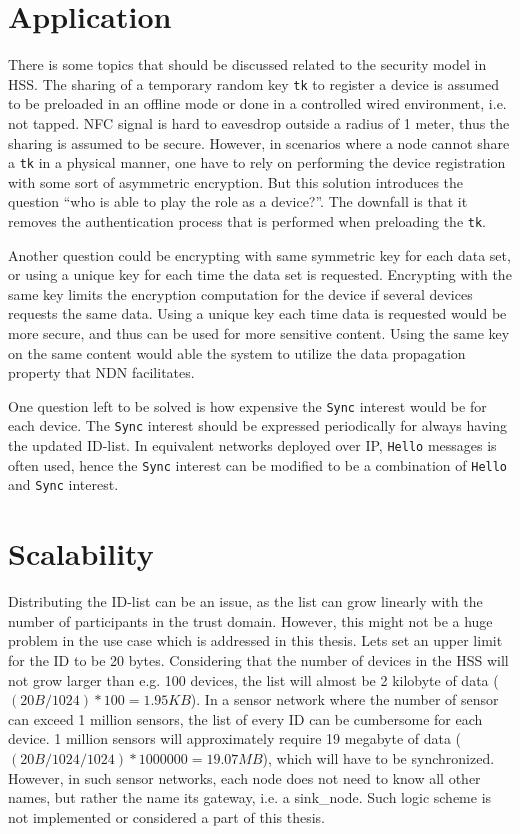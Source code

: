 \section{Application}
There is some topics that should be discussed related to the security model in \gls{HSS}.
The sharing of a temporary random key \texttt{tk} to register a device is assumed to be preloaded in an offline mode or done in a controlled wired environment, i.e. not tapped. 
\gls{NFC} signal is hard to eavesdrop outside a radius of 1 meter, thus the sharing is assumed to be secure.
However, in scenarios where a node cannot share a \texttt{tk} in a physical manner, one have to rely on performing the device registration with some sort of asymmetric encryption. 
But this solution introduces the question ``who is able to play the role as a device?''.
The downfall is that it removes the authentication process that is performed when preloading the \texttt{tk}.

Another question could be encrypting with same symmetric key for each data set, or using a unique key for each time the data set is requested.
Encrypting with the same key limits the encryption computation for the device if several devices requests the same \gls{data}.
Using a unique key each time \gls{data} is requested would be more secure, and thus can be used for more sensitive content.
Using the same key on the same content would able the system to utilize the data propagation property that \gls{NDN} facilitates.

One question left to be solved is how expensive the \texttt{Sync} \gls{interest} would be for each device. 
The \texttt{Sync} \gls{interest} should be expressed periodically for always having the updated ID-list. 
In equivalent networks deployed over \gls{IP}, \texttt{Hello} messages is often used, hence the \texttt{Sync} \gls{interest} can be modified to be a combination of \texttt{Hello} and \texttt{Sync} \gls{interest}.

\section{Scalability}
Distributing the \gls{ID}-list can be an issue, as the list can grow linearly with the number of participants in the trust domain.
However, this might not be a huge problem in the use case which is addressed in this thesis.
Lets set an upper limit for the ID to be 20 bytes. 
Considering that the number of devices in the \gls{HSS} will not grow larger than e.g. 100 devices, the list will almost be 2 kilobyte of data ($(20B / 1024) * 100 = 1.95KB$). 
In a sensor network where the number of sensor can exceed 1 million sensors, the list of every ID can be cumbersome for each device.
1 million sensors will approximately require 19 megabyte of data ($(20B / 1024 / 1024) * 1 000 000 = 19.07MB$), which will have to be synchronized.
However, in such sensor networks, each node does not need to know all other names, but rather the name its gateway, i.e. a \gls{sink_node}. 
Such logic scheme is not implemented or considered a part of this thesis.

